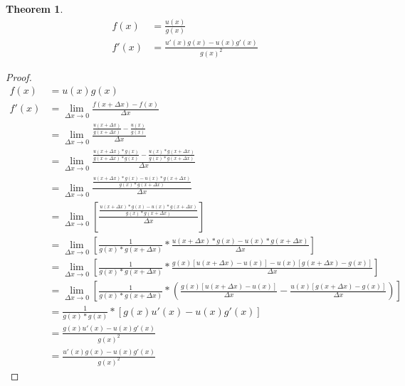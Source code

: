\documentclass{article}
\newtheorem{theorem}{Theorem}[section]
\theoremstyle{definition}
\begin{document}
\begin{theorem}
	\begin{align*}
	f(x)&=\frac {u(x)} {g(x)} \\
	f'(x)&=\frac{u'(x)g(x)-u(x)g'(x)}{g(x)^2}
	\end{align*}
\end{theorem}
\begin{proof}
	\begin{align*}
	f(x) &= u(x)g(x) \\
	f'(x) &= \lim_{\Delta x \to 0} {\frac {f(x+\Delta x) - f(x)} {\Delta x}} \\
	&= \lim_{\Delta x \to 0} {\frac {\frac {u(x+\Delta x)} {g(x+\Delta x)} - \frac {u(x)}{g(x)}} {\Delta x}} \\
	&= \lim_{\Delta x \to 0} {\frac {\frac {u(x+\Delta x)*g(x)} {g(x+\Delta x)*g(x)} - \frac {u(x)*g(x+\Delta x)}{g(x)*g(x+\Delta x)}} {\Delta x}} \\	
	&= \lim_{\Delta x \to 0} {\frac {\frac {u(x+\Delta x)*g(x) - u(x)*g(x+\Delta x)} {g(x)*g(x+\Delta x)}} {\Delta x}} \\
	&= \lim_{\Delta x \to 0} \left[ {\frac {\frac {u(x+\Delta x)*g(x) - u(x)*g(x+\Delta x)} {g(x)*g(x+\Delta x)}} {\Delta x}} \right] \\
	&= \lim_{\Delta x \to 0} \left[ {\frac {1} {g(x)*g(x+\Delta x)} * \frac {u(x+\Delta x)*g(x) - u(x)*g(x+\Delta x)} {\Delta x}} \right] \\
	&= \lim_{\Delta x \to 0} \left[ {\frac {1} {g(x)*g(x+\Delta x)} * \frac {g(x)[u(x+\Delta x)-u(x)] - u(x)[g(x+\Delta x) - g(x)]} {\Delta x}} \right] \\
	&= \lim_{\Delta x \to 0} \left[ {\frac {1} {g(x)*g(x+\Delta x)} * \left( \frac {g(x)[u(x+\Delta x)-u(x)]} {\Delta x} - \frac {u(x)[g(x+\Delta x) - g(x)]} {\Delta x} \right)} \right]\\
	&= \frac {1} {g(x)*g(x)} * \left[ g(x)u'(x) - u(x)g'(x) \right]\\
	&= \frac {g(x)u'(x) - u(x)g'(x)} {g(x)^2}\\
	&= \frac {u'(x)g(x) - u(x)g'(x)} {g(x)^2}
	\end{align*}
\end{proof}
\end{document}
